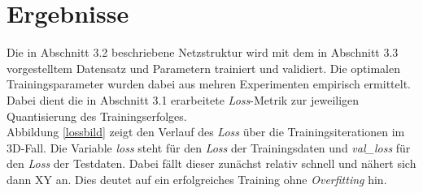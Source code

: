 \section{Ergebnisse}
Die in Abschnitt 3.2 beschriebene Netzstruktur wird mit dem in Abschnitt 3.3 vorgestelltem Datensatz und Parametern trainiert und validiert. Die optimalen Trainingsparameter wurden dabei aus mehren Experimenten empirisch ermittelt. Dabei dient die in Abschnitt 3.1 erarbeitete \textit{Loss}-Metrik zur jeweiligen Quantisierung des Trainingserfolges. \\Abbildung \ref{lossbild} zeigt den Verlauf des \textit{Loss} über die Trainingsiterationen im 3D-Fall. Die Variable \textit{loss} steht für den \textit{Loss}  der Trainingsdaten und \textit{val\_loss} für den \textit{Loss} der Testdaten. Dabei fällt dieser zunächst relativ schnell und nähert sich dann XY an. Dies deutet auf ein erfolgreiches Training ohne \textit{Overfitting} hin. 
 
